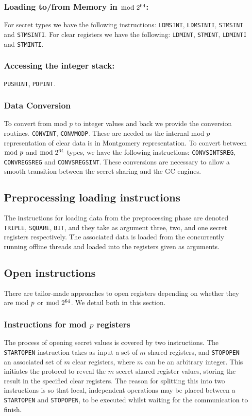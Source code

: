 \subsubsection{Loading to/from Memory in $\bmod \; 2^{64}$:}
For secret types we have the following instructions: \verb+LDMSINT+, \verb+LDMSINTI+, \verb+STMSINT+ and \verb+STMSINTI+. For clear registers we have the following: \verb+LDMINT+, \verb+STMINT+, \verb+LDMINTI+ and \verb+STMINTI+.

\subsubsection{Accessing the integer stack:}
\verb+PUSHINT+, \verb+POPINT+.

\subsubsection{Data Conversion}
To convert from mod $p$ to integer values and
back we provide the conversion routines.
\verb+CONVINT+, \verb+CONVMODP+.
These are needed as the internal mod $p$ representation
of clear data is in Montgomery representation.
To convert between $\bmod \; p$ and $\bmod \; 2^{64}$ types, we have the following instructions: \verb+CONVSINTSREG+, \verb+CONVREGSREG+ and \verb+CONVSREGSINT+. These conversions are necessary to allow a smooth transition between the secret sharing and the GC engines.

\subsection{Preprocessing loading instructions}
The instructions for loading data from the preprocessing phase
are denoted \verb+TRIPLE+, \verb+SQUARE+, \verb+BIT+,
and they take as argument three, two, and one secret registers 
respectively.
The associated data is loaded from the concurrently running
offline threads and loaded into the registers given as arguments.

\subsection{Open instructions}
There are tailor-made approaches to open registers depending on whether they are $\bmod \; p$ or $\bmod \; 2^{64}$. We detail both in this section. 

\subsubsection{Instructions for mod $p$ registers}
The process of opening secret values is covered by two instructions.
The \verb+STARTOPEN+ instruction takes as input a set of $m$
shared registers, and \verb+STOPOPEN+ an associated set of $m$
clear registers, where $m$ can be an arbitrary integer.
This initiates the protocol to reveal the $m$ secret shared register values,
storing the result in the specified clear registers. The reason for
splitting this into two instructions is so that local, independent
operations may be placed between a \verb+STARTOPEN+ and \verb+STOPOPEN+,
to be executed whilst waiting for the communication to finish.

